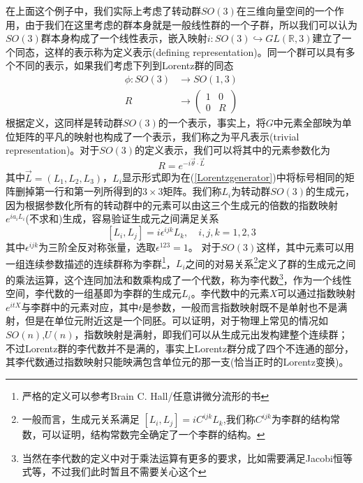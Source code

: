 在上面这个例子中，我们实际上考虑了转动群$SO(3)$在三维向量空间的一个作用，由于我们在这里考虑的群本身就是一般线性群的一个子群，所以我们可以认为$SO(3)$群本身构成了一个线性表示，嵌入映射$i:SO(3)\hookrightarrow GL(\mathbb{R},3)$建立了一个同态，这样的表示称为定义表示(defining representation)。同一个群可以具有多个不同的表示，如果我们考虑下列到Lorentz群的同态
\begin{equation}
    \begin{aligned}
    \phi:SO(3) &\longrightarrow SO(1,3)\\
    R &\longrightarrow  \left(
    \begin{array}{cc}
        1 &0  \\
         0&R 
    \end{array} \right)
    \end{aligned}
\end{equation}
根据定义，这同样是转动群$SO(3)$的一个表示，事实上，将$G$中元素全部映为单位矩阵的平凡的映射也构成了一个表示，我们称之为平凡表示(trivial representation)。对于$SO(3)$的定义表示，我们可以将其中的元素参数化为
\begin{equation}
    R=e^{-i\vec{\theta}\cdot\vec{L}}
\end{equation}
其中$\vec{L}=(L_{1},L_{2},L_{3})$，$L_{i}$显示形式即为在(\ref{Lorentzgenerator})中将标号相同的矩阵删掉第一行和第一列所得到的$3\times3$矩阵。我们称$L_{i}$为转动群$SO(3)$的生成元，因为根据参数化所有的转动群中的元素可以由这三个生成元的倍数的指数映射$e^{ia_{i}L_{i}}$(不求和)生成，容易验证生成元之间满足关系
\begin{equation}
    \left[L_{i},L_{j}\right]=i\epsilon^{ijk}L_{k},\quad i,j,k=1,2,3
\end{equation}
其中$\epsilon^{ijk}$为三阶全反对称张量，选取$\epsilon^{123}=1$。
对于$SO(3)$这样，其中元素可以用一组连续参数描述的连续群称为李群\footnote{严格的定义可以参考Brain C. Hall/任意讲微分流形的书}，$L_
{i}$之间的对易关系\footnote{一般而言，生成元关系满足 $\left[L_{i},L_{j}\right]=iC^{ijk}L_{k}$,我们称$C^{ijk}$为李群的结构常数，可以证明，结构常数完全确定了一个李群的结构。}定义了群的生成元之间的乘法运算，这个连同加法和数乘构成了一个代数，称为李代数\footnote{当然在李代数的定义中对于乘法运算有更多的要求，比如需要满足Jacobi恒等式等，不过我们此时暂且不需要关心这个}，作为一个线性空间，李代数的一组基即为李群的生成元$L_{i}$。李代数中的元素$X$可以通过指数映射$e^{itX}$与李群中的元素对应，其中$t$是参数，一般而言指数映射既不是单射也不是满射，但是在单位元附近这是一个同胚。可以证明，对于物理上常见的情况如$SO(n)$,$U(n)$，指数映射是满射，即我们可以从生成元出发构建整个连续群；不过Lorentz群的李代数并不是满的，事实上Lorentz群分成了四个不连通的部分，其李代数通过指数映射只能映满包含单位元的那一支(恰当正时的Lorentz变换)。

